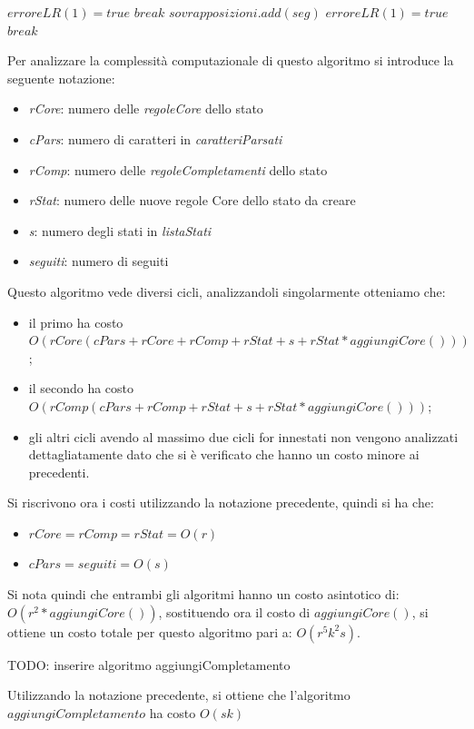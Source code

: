 \documentclass[12pt]{article}
\begin{document}
\begin{algorithm}[H]
\begin{algorithmic}
\State $erroreLR(1) = true$
\State $break$
\Else
\State $sovrapposizioni.add(seg)$
\EndIf
\EndFor
\EndIf
\EndFor
{}
\State $erroreLR(1) = true$
\State $break$
\EndIf
\EndFor
\end{algorithmic}
\end{algorithm}
Per analizzare la complessità computazionale di questo algoritmo si introduce la seguente notazione:
\begin{itemize}
\item \textit{rCore}: numero delle \textit{regoleCore} dello stato
\item \textit{cPars}: numero di caratteri in \textit{caratteriParsati}
\item \textit{rComp}: numero delle \textit{regoleCompletamenti} dello stato
\item \textit{rStat}: numero delle nuove regole Core dello stato da creare
\item \textit{s}: numero degli stati in \textit{listaStati}
\item \textit{seguiti}: numero di seguiti
\end{itemize}
Questo algoritmo vede diversi cicli, analizzandoli singolarmente otteniamo che:
\begin{itemize}
\item il primo ha costo $O(rCore(cPars+rCore+rComp+rStat+s+rStat*aggiungiCore()))$;
\item il secondo ha costo $O(rComp(cPars + rComp+ rStat+ s + rStat*aggiungiCore()))$;
\item gli altri cicli avendo al massimo due cicli for innestati non vengono analizzati dettagliatamente dato che si è verificato che hanno un costo minore ai precedenti.
\end{itemize}
Si riscrivono ora i costi utilizzando la notazione precedente, quindi si ha che:
\begin{itemize}
\item $rCore = rComp = rStat = O(r)$
\item $cPars = seguiti = O(s)$
\end{itemize}
Si nota quindi che entrambi gli algoritmi hanno un costo asintotico di: $O(r^2*aggiungiCore())$, sostituendo ora il costo di $aggiungiCore()$, si ottiene un costo totale per questo algoritmo pari a: $O(r^5 k^2 s)$.
\par\pagebreak
TODO: inserire algoritmo aggiungiCompletamento\par
Utilizzando la notazione precedente, si ottiene che l'algoritmo $aggiungiCompletamento$ ha costo $O(sk)$
\par\pagebreak[4]
\end{document}
